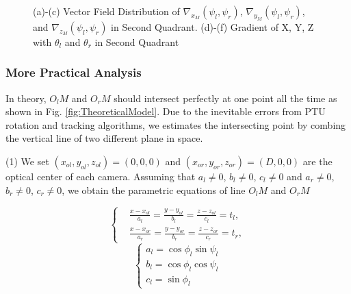 \begin{figure}[!tb]
{	}	
	\caption{(a)-(c) Vector Field Distribution of $\nabla_{x_M}(\psi_l, \psi_r)$, $\nabla_{y_M}(\psi_l, \psi_r)$, and $\nabla_{z_M}(\psi_l, \psi_r)$ in Second Quadrant. (d)-(f) Gradient of X, Y, Z with $\theta_l$ and  $\theta_r$ in Second Quadrant}
\end{figure}




\subsubsection{More Practical Analysis}
In theory, $O_lM$ and $O_rM$ should intersect perfectly at one point all the time as shown in Fig. \ref{fig:TheoreticalModel}. Due to the inevitable errors from PTU rotation and tracking algorithms, we estimates the intersecting point by combing the vertical line of two different plane in space.

(1) We set $(x_{ol}, y_{ol}, z_{ol})=(0, 0, 0)$ and $(x_{or}, y_{or}, z_{or})=(D, 0, 0)$ are the optical center of each camera. Assuming that $a_l\neq0$, $b_l\neq0$, $c_l\neq0$ and $a_r\neq0$, $b_r\neq0$, $c_r\neq0$, we obtain the parametric equations of line $O_lM$ and $O_rM$ 

\begin{equation}  
\left \{
	\begin{split}
		&\frac{x-x_{ol}}{a_l} = \frac{y-y_{ol}}{b_l} = \frac{z-z_{ol}}{c_l} = t_l,\\
		&\frac{x-x_{or}}{a_r} = \frac{y-y_{or}}{b_r} = \frac{z-z_{or}}{c_r} = t_r,
	\end{split}
\right.
\end{equation}
\begin{equation}  
\left\{ 
\begin{array}{lll} 
a_l = \cos \phi_l \sin \psi_l\\
b_l = \cos \phi_l \cos \psi_l\\
c_l = \sin \phi_l
\end{array} 
\right.
\end{equation}

